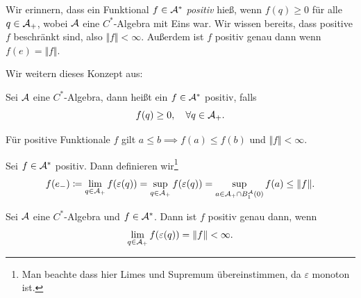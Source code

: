 Wir erinnern, dass ein Funktional $f \in \mathcal{A}^*$ \emph{positiv} hieß, wenn $f(q) \geq 0$ für alle $q \in \mathcal{A}_+$, wobei $\mathcal{A}$ eine $C^*$-Algebra mit Eins war. Wir wissen bereits, dass positive $f$ beschränkt sind, also $\Vert f \Vert < \infty$. Außerdem ist $f$ positiv genau dann wenn $f(e) = \Vert f \Vert$.

Wir weitern dieses Konzept aus:

\begin{definition}
    Sei $\mathcal{A}$ eine $C^*$-Algebra, dann heißt ein $f \in \mathcal{A}^*$ positiv, falls
    $$ f(q) \geq 0, \quad \forall q \in \mathcal{A}_+. $$
\end{definition}

Für positive Funktionale $f$ gilt $a \leq b \implies f(a) \leq f(b)$ und $\Vert f \Vert < \infty$.

\begin{definition}
    Sei $f \in \mathcal{A}^*$ positiv. Dann definieren wir\footnote{Man beachte dass hier Limes und Supremum übereinstimmen, da $\varepsilon$ monoton ist.}
    \[
        f(e_-) \coloneqq \lim_{q \in \mathcal{A}_+} f(\varepsilon(q)) = \sup_{q \in \mathcal{A}_+} f(\varepsilon(q)) = \sup_{a \in \mathcal{A}_+ \cap B_1^{\mathcal{A}} (0)} f(a) \leq \Vert f \Vert.
    \]
\end{definition}

\begin{theorem}
    Sei $\mathcal{A}$ eine $C^*$-Algebra und $f \in \mathcal{A}^*$. Dann ist $f$ positiv genau dann, wenn
    \[
        \lim_{q \in \mathcal{A}_+} f(\varepsilon(q)) = \Vert f \Vert < \infty.
    \]
\end{theorem}

